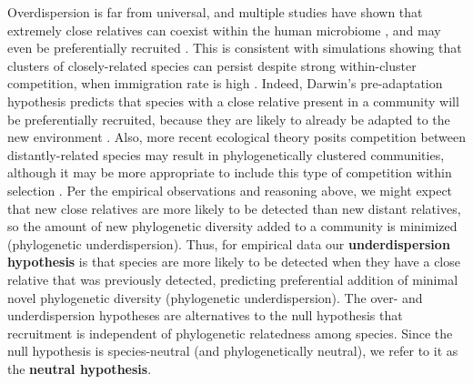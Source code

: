 \documentclass{article}
\begin{document}
\par
Overdispersion is far from universal, and multiple studies have shown that extremely close relatives can coexist within the human microbiome \cite{Li2016,Tett2019,Stecher2010}, and may even be preferentially recruited \cite{Brown2018}. This is consistent with simulations showing that clusters of closely-related species can persist despite strong within-cluster competition, when immigration rate is high \cite{DAndrea2019}. Indeed, Darwin’s pre-adaptation hypothesis predicts that species with a close relative present in a community will be preferentially recruited, because they are likely to already be adapted to the new environment \cite{Darwin1859}. Also, more recent ecological theory posits competition between distantly-related species may result in phylogenetically clustered communities, although it may be more appropriate to include this type of competition within selection \cite{Mayfield2010}. Per the empirical observations and reasoning above, we might expect that new close relatives are more likely to be detected than new distant relatives, so the amount of new phylogenetic diversity added to a community is minimized (phylogenetic underdispersion). Thus, for empirical data our \textbf{underdispersion hypothesis} is that species are more likely to be detected when they have a close relative that was previously detected, predicting preferential addition of minimal novel phylogenetic diversity (phylogenetic underdispersion). The over- and underdispersion hypotheses are alternatives to the null hypothesis that recruitment is independent of phylogenetic relatedness among species. Since the null hypothesis is species-neutral (and phylogenetically neutral), we refer to it as the \textbf{neutral hypothesis}.
\par
\end{document}
